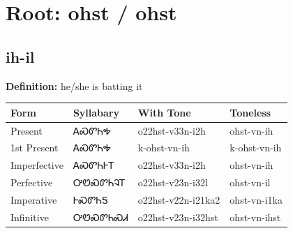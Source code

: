 \documentclass{article}%
\begin{document}
%
\normalsize%
\section*{Root: ohst / ohst}%
\subsection*{ih-il}%
\textbf{Definition: }%
he/she is batting it%
\\[0.5em]%
\begin{tabular}{|l|l|l|l|}%
\hline%
\textbf{Form}&\textbf{Syllabary}&\textbf{With Tone}&\textbf{Toneless}\\%
\hline%
Present&ᎪᏍᏛᏂᎭ&o22hst{-}v33n{-}i2h&ohst{-}vn{-}ih\\%
1st Present&ᎪᏍᏛᏂᎭ&k{-}ohst{-}vn{-}ih&k{-}ohst{-}vn{-}ih\\%
Imperfective&ᎪᏍᏛᏂᎰᎢ&o22hst{-}v33n{-}i2h&ohst{-}vn{-}ih\\%
Perfective&ᎤᏬᏍᏛᏂᎸᎢ&o22hst{-}v23n{-}i32l&ohst{-}vn{-}il\\%
Imperative&ᎰᏍᏛᏂᎦ&o22hst{-}v22n{-}i21ka2&ohst{-}vn{-}i1ka\\%
Infinitive&ᎤᏬᏍᏛᏂᏍᏗ&o22hst{-}v23n{-}i32hst&ohst{-}vn{-}ihst\\%
\hline%
\end{tabular}%
\\[1em]%
\end{document}
